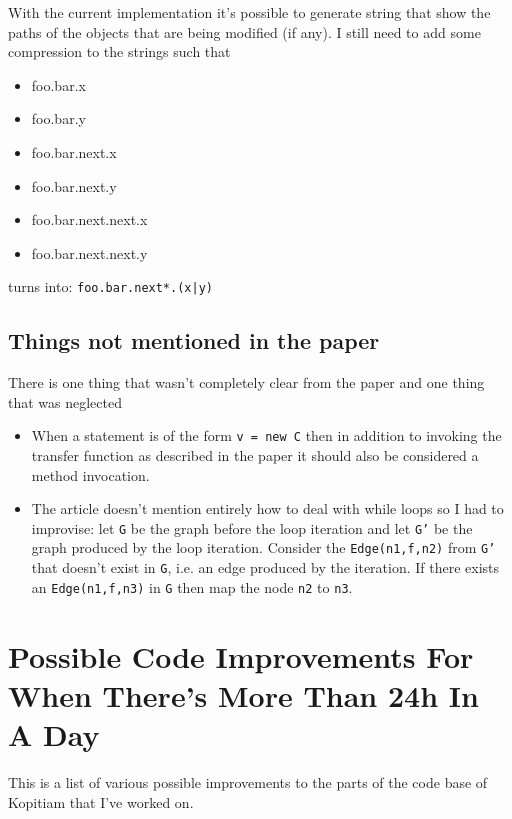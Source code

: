 \documentclass[11pt]{exam}
\begin{document}
With the current implementation it's possible to generate string that show the paths of the objects that are being modified (if any). I still need to add some compression to the strings such that

\begin{itemize}
  \setlength{\itemsep}{1pt}
  \setlength{\parskip}{0pt}
  \item foo.bar.x
  \item foo.bar.y
  \item foo.bar.next.x
  \item foo.bar.next.y
  \item foo.bar.next.next.x
  \item foo.bar.next.next.y
\end{itemize}

turns into: \texttt{foo.bar.next*.(x|y)}

\subsection{Things not mentioned in the paper}

There is one thing that wasn't completely clear from the paper and one thing that was neglected

\begin{itemize}
  \item When a statement is of the form \texttt{v = new C} then in addition to invoking the transfer function as described in the paper it should also be considered a method invocation.
  \item The article doesn't mention entirely how to deal with while loops so I had to improvise: let \texttt{G} be the graph before the loop iteration and let \texttt{G'} be the graph produced by the loop iteration. Consider the \texttt{Edge(n1,f,n2)} from \texttt{G'} that doesn't exist in \texttt{G}, i.e. an edge produced by the iteration. If there exists an \texttt{Edge(n1,f,n3)} in \texttt{G} then map the node \texttt{n2} to \texttt{n3}.
\end{itemize}

\newpage

\section{Possible Code Improvements For When There's More Than 24h In A Day}

This is a list of various possible improvements to the parts of the code base of Kopitiam that I've worked on.
\end{document}
